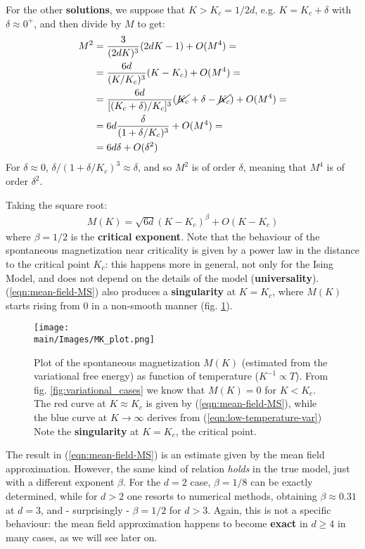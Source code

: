 \documentclass[../../main.tex]{subfiles}
\begin{document}
For the other \textbf{solutions}, we suppose that $K > K_c = 1/2d$, e.g. $K = K_c + \delta$ with $\delta \approx 0^+$, and then divide by $M$ to get:
\begin{align*}
    M^2 &= \frac{3}{(2dK)^3}(2dK-1) + O(M^4) =\\
        &= \frac{6d}{(K/K_c)^3} (K-K_c)  + O(M^4) =\\
        &= \frac{6d}{[(K_c + \delta)/K_c]^3} (\cancel{K_c}+\delta - \cancel{K_c}) + O(M^4) =\\
        &= 6d \frac{\delta}{(1+ \delta/K_c)^3} + O(M^4) =\\
        &= 6d \delta + O(\delta^2)
\end{align*}
For $\delta \approx 0$, $\delta/(1+ \delta/K_c)^3 \approx \delta$, and so $M^2$ is of order $\delta$, meaning that $M^4$ is of order $\delta^2$. 

Taking the square root:
\begin{align}\label{eqn:mean-field-MS}
    M(K) = \sqrt{6d} (K-K_c)^\beta + O(K-K_c)
\end{align}
where $\beta = 1/2$ is the \textbf{critical exponent}. Note that the behaviour of the spontaneous magnetization near criticality is given by a power law in the distance to the critical point $K_c$: this happens more in general, not only for the Ising Model, and does not depend on the details of the model  (\textbf{universality}). (\ref{eqn:mean-field-MS}) also produces a \textbf{singularity} at $K=K_c$, where $M(K)$ starts rising from $0$ in a non-smooth manner (fig. \ref{fig:MK_plot}).

\begin{figure}[H]
    \centering
    \texttt{[image: \\main/Images/MK\_plot.png]}
    \caption{Plot of the spontaneous magnetization $M(K)$ (estimated from the variational free energy) as function of temperature ($K^{-1} \propto T$).
    From fig. \ref{fig:variational_cases} we know that $M(K) = 0$ for $K < K_c$. The red curve at $K \approx K_c$ is given by (\ref{eqn:mean-field-MS}), while the blue curve at $K \to \infty$ derives from (\ref{eqn:low-temperature-var})
    Note the \textbf{singularity} at $K=K_c$, the critical point. }
    \label{fig:MK_plot}
\end{figure}

The result in (\ref{eqn:mean-field-MS}) is an estimate given by the mean field approximation. However, the same kind of relation \textit{holds} in the true model, just with a different exponent $\beta$. For the $d=2$ case, $\beta = 1/8$ can be exactly determined, while for $d > 2$ one resorts to numerical methods, obtaining $\beta \approx 0.31$ at $d=3$, and - surprisingly - $\beta = 1/2$ for $d > 3$. Again, this is not a specific behaviour: the mean field approximation happens to become \textbf{exact} in $d \geq 4$ in many cases, as we will see later on.   
\end{document}
